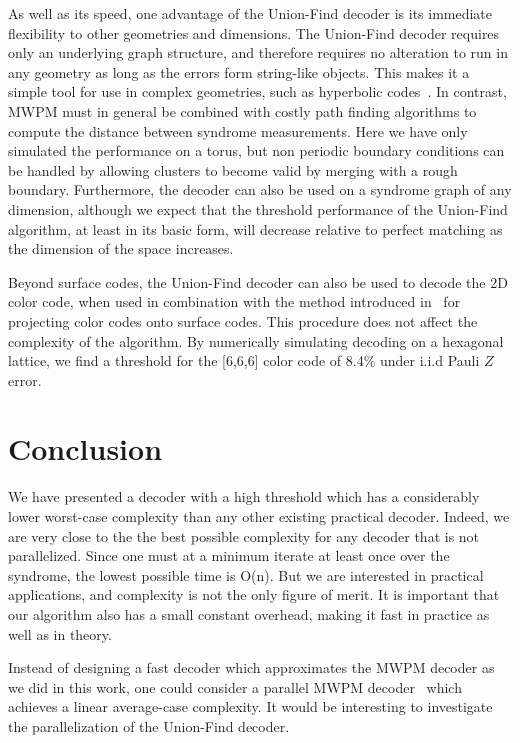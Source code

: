 \documentclass[a4paper, 10pt, accepted=2021-11-03]{quantumarticle}
\begin{document}
{\medskip
As well as its speed, one advantage of the Union-Find decoder is its immediate flexibility to other geometries and dimensions. The Union-Find decoder requires only an underlying graph structure, and therefore requires no alteration to run in any geometry as long as the errors form string-like objects. This makes it a simple tool for use in complex geometries, such as hyperbolic codes~\cite{freedman2002z,zemor2009cayley,delfosse2013tradeoffs,breuckmann2016:hyperbolic,breuckmann2017hyperbolic}. In contrast, MWPM must in general be combined with costly path finding algorithms to compute the distance between syndrome measurements. Here we have only simulated the performance on a torus, but non periodic boundary conditions can be handled by allowing clusters to become valid by merging with a rough boundary. Furthermore, the decoder can also be used on a syndrome graph of any dimension, although we expect that the threshold performance of the Union-Find algorithm, at least in its basic form, will decrease relative to perfect matching as the dimension of the space increases. 

\medskip
Beyond surface codes, the Union-Find decoder can also be used to decode the 2D color code, when used in combination with the method introduced in~\cite{delfosse2014decoding} for projecting color codes onto surface codes. This procedure does not affect the complexity of the algorithm. By numerically simulating decoding on a hexagonal lattice, we find a threshold for the [6,6,6] color code of 8.4\% under i.i.d Pauli $Z$ error. 


\section{Conclusion}

We have presented a decoder with a high threshold which has a considerably lower worst-case complexity than any other existing practical decoder. 
Indeed, we are very close to the the best possible complexity for any decoder that is not parallelized. 
Since one must at a minimum iterate at least once over the syndrome, the lowest possible time is O(n). 
But we are interested in practical applications, and complexity is not the only figure of merit. It is 
important that our algorithm also has a small constant overhead, making it fast in practice as well as in theory.

\medskip
Instead of designing a fast decoder which approximates the MWPM decoder as we did in this work, one could consider a parallel MWPM decoder~\cite{fowler2015:parallel_MWPM} which achieves a linear average-case complexity. It would be interesting to investigate the parallelization of the Union-Find decoder.

}
\end{document}
